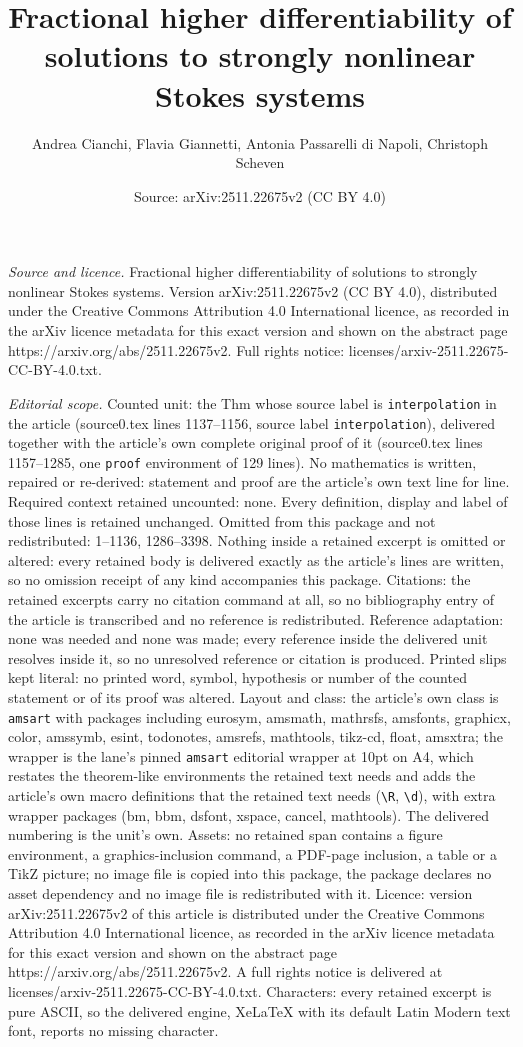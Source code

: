 \documentclass[10pt,a4paper]{amsart}
\title[Fractional higher differentiability of solutions to strongly]{Fractional higher differentiability of solutions to strongly nonlinear Stokes systems}
\author{Andrea Cianchi, Flavia Giannetti, Antonia Passarelli di Napoli, Christoph Scheven}
\date{Source: arXiv:2511.22675v2 (CC BY 4.0)}
\begin{document}
\maketitle

\noindent\emph{Source and licence.} Fractional higher differentiability of solutions to strongly nonlinear Stokes systems. Version arXiv:2511.22675v2 (CC BY 4.0), distributed under the Creative Commons Attribution 4.0 International licence, as recorded in the arXiv licence metadata for this exact version and shown on the abstract page https://arxiv.org/abs/2511.22675v2. Full rights notice: licenses/arxiv-2511.22675-CC-BY-4.0.txt.\par\smallskip

\noindent\textit{Editorial scope.} Counted unit: the Thm whose source label is \texttt{interpolation} in the article (source0.tex lines 1137--1156, source label \texttt{interpolation}), delivered together with the article's own complete original proof of it (source0.tex lines 1157--1285, one \texttt{proof} environment of 129 lines). No mathematics is written, repaired or re-derived: statement and proof are the article's own text line for line. Required context retained uncounted: none. Every definition, display and label of those lines is retained unchanged. Omitted from this package and not redistributed: 1--1136, 1286--3398. Nothing inside a retained excerpt is omitted or altered: every retained body is delivered exactly as the article's lines are written, so no omission receipt of any kind accompanies this package. Citations: the retained excerpts carry no citation command at all, so no bibliography entry of the article is transcribed and no reference is redistributed. Reference adaptation: none was needed and none was made; every reference inside the delivered unit resolves inside it, so no unresolved reference or citation is produced. Printed slips kept literal: no printed word, symbol, hypothesis or number of the counted statement or of its proof was altered. Layout and class: the article's own class is \texttt{amsart} with packages including eurosym, amsmath, mathrsfs, amsfonts, graphicx, color, amssymb, esint, todonotes, amsrefs, mathtools, tikz-cd, float, amsxtra; the wrapper is the lane's pinned \texttt{amsart} editorial wrapper at 10pt on A4, which restates the theorem-like environments the retained text needs and adds the article's own macro definitions that the retained text needs (\texttt{\textbackslash R}, \texttt{\textbackslash d}), with extra wrapper packages (bm, bbm, dsfont, xspace, cancel, mathtools). The delivered numbering is the unit's own. Assets: no retained span contains a figure environment, a graphics-inclusion command, a PDF-page inclusion, a table or a TikZ picture; no image file is copied into this package, the package declares no asset dependency and no image file is redistributed with it. Licence: version arXiv:2511.22675v2 of this article is distributed under the Creative Commons Attribution 4.0 International licence, as recorded in the arXiv licence metadata for this exact version and shown on the abstract page https://arxiv.org/abs/2511.22675v2. A full rights notice is delivered at licenses/arxiv-2511.22675-CC-BY-4.0.txt. Characters: every retained excerpt is pure ASCII, so the delivered engine, XeLaTeX with its default Latin Modern text font, reports no missing character.
\end{document}
